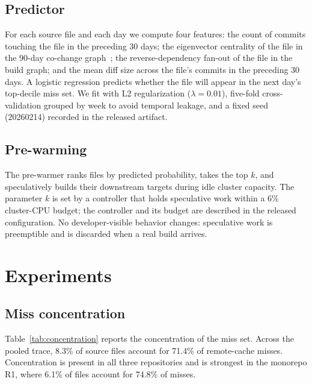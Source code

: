 \documentclass{anvil-paper}
\begin{document}
\subsection{Predictor}

For each source file and each day we compute four features: the count of
commits touching the file in the preceding 30 days; the eigenvector centrality
of the file in the 90-day co-change graph~\cite{imani2017graphcentrality};
the reverse-dependency fan-out of the file in the build graph; and the mean
diff size across the file's commits in the preceding 30 days. A logistic
regression predicts whether the file will appear in the next day's
top-decile miss set. We fit with L2 regularization ($\lambda = 0.01$), five-fold
cross-validation grouped by week to avoid temporal leakage, and a fixed seed
(20260214) recorded in the released artifact.

\subsection{Pre-warming}

The pre-warmer ranks files by predicted probability, takes the top $k$, and
speculatively builds their downstream targets during idle cluster capacity.
The parameter $k$ is set by a controller that holds speculative work within a
6\% cluster-CPU budget; the controller and its budget are described in the
released configuration. No developer-visible behavior changes: speculative
work is preemptible and is discarded when a real build arrives.

\section{Experiments}
\label{sec:experiments}

\subsection{Miss concentration}

Table~\ref{tab:concentration} reports the concentration of the miss set. Across
the pooled trace, 8.3\% of source files account for 71.4\% of remote-cache
misses. Concentration is present in all three repositories and is strongest in
the monorepo R1, where 6.1\% of files account for 74.8\% of misses.
\end{document}

